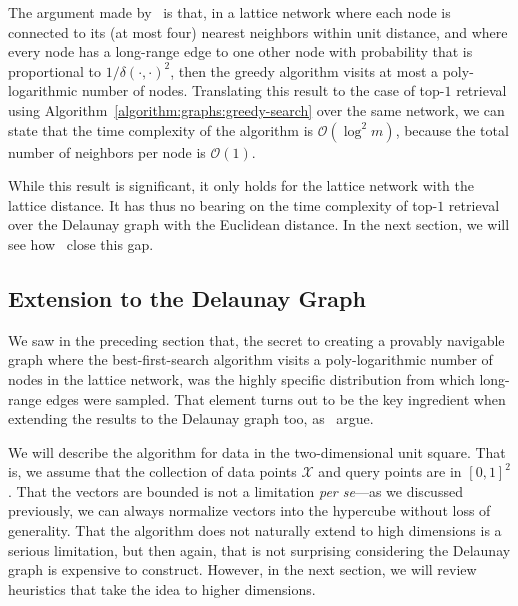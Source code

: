 The argument made by~\cite{kleinberg2000sw} is that, in a lattice network
where each node is connected to its (at most four) nearest neighbors within
unit distance, and where every node has a long-range edge to one other node
with probability that is proportional to $1/\delta(\cdot, \cdot)^2$, then
the greedy algorithm visits at most a poly-logarithmic number of nodes.
Translating this result to the case of top-$1$ retrieval using
Algorithm~\ref{algorithm:graphs:greedy-search} over the same network,
we can state that
the time complexity of the algorithm is $\mathcal{O}(\log^2 m)$,
because the total number of neighbors per node is $\mathcal{O}(1)$.

While this result is significant, it only holds for the lattice network
with the lattice distance. It has thus no bearing on the time complexity of
top-$1$ retrieval over the Delaunay graph with the Euclidean distance.
In the next section, we will see how~\cite{voronet2007} close this gap.

\subsection{Extension to the Delaunay Graph}
We saw in the preceding section that, the secret to creating a 
provably navigable graph where the best-first-search algorithm
visits a poly-logarithmic number of nodes in the lattice network, was the
highly specific distribution from which long-range edges were sampled.
That element turns out to be the key ingredient when extending
the results to the Delaunay graph too, as~\cite{voronet2007} argue.

We will describe the algorithm for data in the two-dimensional unit square.
That is, we assume that the collection of data points $\mathcal{X}$
and query points are in $[0, 1]^2$.
That the vectors are bounded is not a limitation \emph{per se}---as we discussed previously,
we can always normalize vectors into the hypercube without loss of generality.
That the algorithm does not naturally extend to high dimensions is a serious
limitation, but then again, that is not surprising considering the Delaunay graph
is expensive to construct. However, in the next section, we will review
heuristics that take the idea to higher dimensions.

